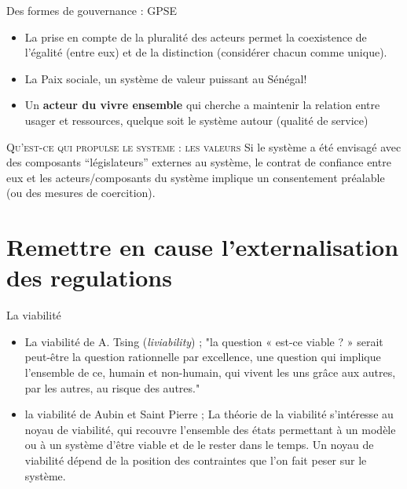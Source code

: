 \documentclass[newPxFont]{beamer}
\begin{document}
      \begin{frame}[c]{Des formes de gouvernance : GPSE}
      \vspace{-1cm}
      \begin{itemize}
          \item La prise en compte de la pluralité des acteurs permet la coexistence de l’égalité (entre eux) et de la distinction (considérer chacun comme unique).
          \item La Paix sociale, un système de valeur puissant au Sénégal!
          \item Un \textbf{acteur du vivre ensemble} qui cherche a maintenir la relation entre usager et ressources, quelque soit le système autour (qualité de service)
      \end{itemize}
       \small{
         \begin{alertblock}{\textsc{Qu'est-ce qui propulse le systeme : les valeurs }}
          Si le système a été envisagé avec des composants “législateurs” externes au système, le contrat de confiance entre eux et les acteurs/composants du système implique un consentement préalable (ou des mesures de coercition).
         \end{alertblock}
       }
      \end{frame}


\section{Remettre en cause l'externalisation des regulations}

\begin{frame}[c]{La viabilité}
  \vspace{-1cm}
  \begin{itemize}
    \item La viabilité de A. Tsing (\textit{liviability}) ; "la question « est-ce viable ? » serait peut-être la question rationnelle par excellence, une question qui implique l'ensemble de ce, humain et non-humain, qui vivent les uns grâce aux autres, par les autres, au risque des autres."
    \item la viabilité de Aubin et Saint Pierre ; La théorie de la viabilité s’intéresse au noyau de viabilité, qui recouvre l’ensemble des états permettant à un modèle ou à un système d’être viable et de le rester dans le temps. Un noyau de viabilité dépend de la position des contraintes que l’on fait peser sur le système.
  \end{itemize}


\end{frame}
\end{document}
